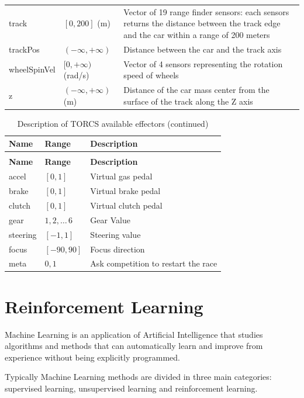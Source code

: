 \documentclass[Lau,oneside,noexaminfo]{sapthesis} %
\begin{document}
\begin{longtable}{p{}p{}p{}}
track         & $[0, 200]$ (m)      & Vector of 19 range finder sensors: each sensors returns the distance between the track edge and the car within a range of 200 meters \\
trackPos      & $(-\infty, +\infty)$          & Distance between the car and the track axis      \\
wheelSpinVel  & $[0, +\infty)$ (rad/s)  & Vector of 4 sensors representing the rotation speed of wheels \\
z             & $(-\infty, +\infty)$ (m)      & Distance of the car mass center from the surface of the track along the Z axis \\
\end{longtable}
\begin{longtable}{p{}p{}p{}}
\caption{Description of TORCS available effectors}\\
\toprule
\textbf{Name}          & \textbf{Range}            & \textbf{Description}    \\
\midrule
\endfirsthead
\caption{Description of TORCS available effectors (continued)}\\
\toprule
\textbf{Name}          & \textbf{Range}            & \textbf{Description}    \\
\midrule
\endhead
\bottomrule
\endfoot
accel         & $[0, 1]$  & Virtual gas pedal       \\
brake         & $[0, 1]$  & Virtual brake pedal \\
clutch        & $[0, 1]$  & Virtual clutch pedal    \\
gear    & ${1, 2, \dots\, 6}$      & Gear Value \\
steering        & $[-1, 1]$  & Steering value    \\
focus    & $[-90, 90]$     & Focus direction \\
meta        & ${0, 1}$  & Ask competition to restart the race    \\
\end{longtable}

\chapter{Reinforcement Learning}
Machine Learning is an application of Artificial Intelligence that studies algorithms and methods that can automatically learn and improve from experience without being explicitly programmed. 

Typically Machine Learning methods are divided in three main categories: supervised learning, unsupervised learning and reinforcement learning. 
\end{document}
